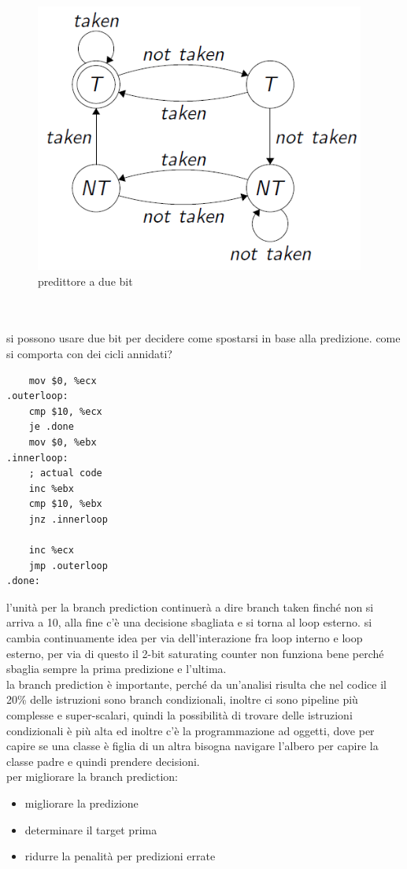 \documentclass[12pt, oneside]{extbook} %
\begin{document}
\begin{figure}[!h]
	\includegraphics[scale=0.7]{immagini/2bit_pred}
	\caption{predittore a due bit}
\end{figure}\\\\
si possono usare due bit per decidere come spostarsi in base alla predizione. come si comporta con dei cicli annidati?
\begin{lstlisting}
	mov $0, %ecx
.outerloop:
	cmp $10, %ecx
	je .done
	mov $0, %ebx
.innerloop:
	; actual code
	inc %ebx
	cmp $10, %ebx
	jnz .innerloop
	
	inc %ecx
	jmp .outerloop
.done:
\end{lstlisting}
l'unità per la branch prediction continuerà a dire branch taken finché non si arriva a 10, alla fine c'è una decisione sbagliata e si torna al loop esterno. si cambia continuamente idea per via dell'interazione fra loop interno e loop esterno, per via di questo il 2-bit saturating counter non funziona bene perché sbaglia sempre la prima predizione e l'ultima.\\ la branch prediction è importante, perché da un'analisi risulta che nel codice il 20\% delle istruzioni sono branch condizionali, inoltre ci sono pipeline più complesse e super-scalari, quindi la possibilità di trovare delle istruzioni condizionali è più alta ed inoltre c'è la programmazione ad oggetti, dove per capire se una classe è figlia di un altra bisogna navigare l'albero per capire la classe padre e quindi prendere decisioni.\\ per migliorare la branch prediction:
\begin{itemize}
\item migliorare la predizione
\item determinare il target prima
\item ridurre la penalità per predizioni errate
\end{itemize}
\end{document}

